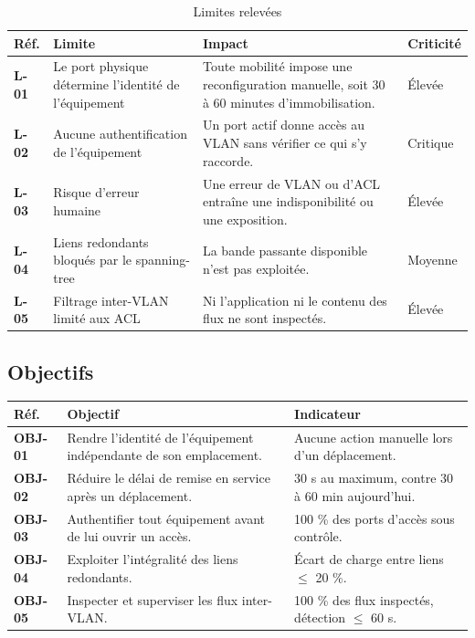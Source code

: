 \documentclass[11pt,a4paper]{article}
\newcommand{\rid}[1]{\textcolor{primary}{\textbf{\small #1}}}
\begin{document}
\begin{table}[H]
\centering
\caption{Limites relevées}
\begin{tabularx}{\textwidth}{L{1.3cm} L{4.5cm} Y C{1.6cm}}
\toprule
{}\textbf{Réf.} & \textbf{Limite} & \textbf{Impact} & \textbf{Criticité} \\
\midrule
\rid{L-01} & Le port physique détermine l'identité de l'équipement & Toute mobilité impose une reconfiguration manuelle, soit 30 à 60 minutes d'immobilisation. & Élevée \\
\rid{L-02} & Aucune authentification de l'équipement & Un port actif donne accès au VLAN sans vérifier ce qui s'y raccorde. & Critique \\
\rid{L-03} & Risque d'erreur humaine & Une erreur de VLAN ou d'ACL entraîne une indisponibilité ou une exposition. & Élevée \\
\rid{L-04} & Liens redondants bloqués par le spanning-tree & La bande passante disponible n'est pas exploitée. & Moyenne \\
\rid{L-05} & Filtrage inter-VLAN limité aux ACL & Ni l'application ni le contenu des flux ne sont inspectés. & Élevée \\
\bottomrule
\end{tabularx}
\end{table}

\subsection{Objectifs}\label{sec:objp2}
\begin{table}[H]
\centering
\begin{tabularx}{\textwidth}{L{1.4cm} Y L{4.6cm}}
\toprule
{}\textbf{Réf.} & \textbf{Objectif} & \textbf{Indicateur} \\
\midrule
\rid{OBJ-01} & Rendre l'identité de l'équipement indépendante de son emplacement. & Aucune action manuelle lors d'un déplacement. \\
\rid{OBJ-02} & Réduire le délai de remise en service après un déplacement. & 30 s au maximum, contre 30 à 60 min aujourd'hui. \\
\rid{OBJ-03} & Authentifier tout équipement avant de lui ouvrir un accès. & 100 \% des ports d'accès sous contrôle. \\
\rid{OBJ-04} & Exploiter l'intégralité des liens redondants. & Écart de charge entre liens $\leq$ 20 \%. \\
\rid{OBJ-05} & Inspecter et superviser les flux inter-VLAN. & 100 \% des flux inspectés, détection $\leq$ 60 s. \\
\bottomrule
\end{tabularx}
\end{table}
\end{document}

